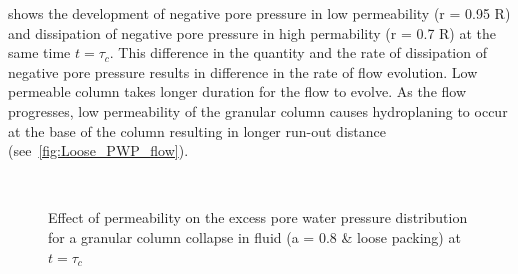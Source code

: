  shows the development of negative pore pressure in low 
permeability (r = 0.95 R) and dissipation of negative pore pressure in high 
permability (r = 0.7 R) at the same time $ t = \tau_c$. This difference in the 
quantity and the rate of dissipation of negative pore pressure results in 
difference in the rate of flow evolution. Low permeable column takes longer 
duration for the flow to evolve. As the flow progresses, low permeability of 
the granular column causes hydroplaning to occur at the base of the column 
resulting in longer run-out distance (see~\cref{fig:Loose_PWP_flow}).
\begin{figure}
\centering
{}\\
\caption{Effect of permeability on the excess pore water pressure distribution 
for a granular column collapse in fluid (a = 0.8 \& loose packing) at $t = 
\tau_c$}
\label{fig:Loose_PWP_ini}
\end{figure}

